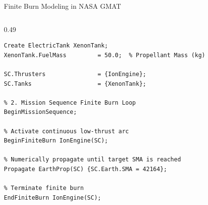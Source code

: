 \documentclass[aspectratio=169, 10pt]{beamer}
\begin{document}
\begin{frame}[fragile]{Finite Burn Modeling in NASA GMAT}
\begin{columns}[T]
\begin{column}{0.49\textwidth}
\begin{lstlisting}[style=gmatstyle]
Create ElectricTank XenonTank;
XenonTank.FuelMass         = 50.0;  % Propellant Mass (kg)

SC.Thrusters               = {IonEngine};
SC.Tanks                   = {XenonTank};

% 2. Mission Sequence Finite Burn Loop
BeginMissionSequence;

% Activate continuous low-thrust arc
BeginFiniteBurn IonEngine(SC);

% Numerically propagate until target SMA is reached
Propagate EarthProp(SC) {SC.Earth.SMA = 42164};

% Terminate finite burn
EndFiniteBurn IonEngine(SC);
\end{lstlisting}
        \end{column}
    \end{columns}
\end{frame}
\end{document}
